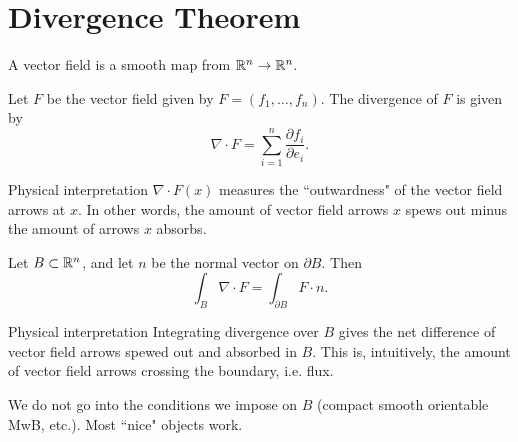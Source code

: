 \section{Divergence Theorem}
A vector field is a smooth map from ${\mathbb R}^n \rightarrow {\mathbb R}^n$.
\begin{dfn}
    Let $F$ be the vector field given by $F = (f_1, \dots, f_n)$.
    The divergence of $F$ is given by
    \[
        \nabla \cdot F
        =
        \sum^{n}_{i=1} \frac{\partial f_i}{\partial e_i}.
    \]
\end{dfn}
\begin{details}{Physical interpretation}
    $\nabla \cdot F(x)$ measures the ``outwardness" of the vector field arrows at $x$. In other words, the amount of vector field arrows $x$ spews out minus the amount of arrows $x$ absorbs.
\end{details}
\begin{thm}
    Let $B \subset {\mathbb R}^n$, and let $n$ be the normal vector on $\partial B$. Then
    \[
        \int_B \nabla \cdot F = \int_{\partial B} F \cdot n.
    \]
\end{thm}
\begin{details}{Physical interpretation}
    Integrating divergence over $B$ gives the net difference of vector field arrows spewed out and absorbed in $B$. This is, intuitively, the amount of vector field arrows crossing the boundary, i.e. flux.
\end{details}
\begin{remark}
    We do not go into the conditions we impose on $B$ (compact smooth orientable MwB, etc.). Most ``nice" objects work.
\end{remark}
